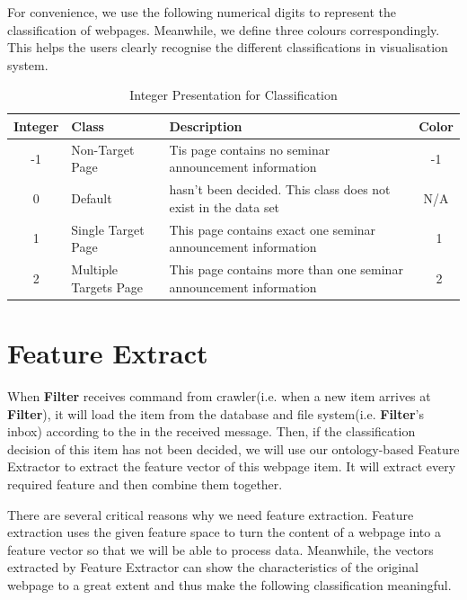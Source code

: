 For convenience, we use the following numerical digits to represent the classification of webpages. Meanwhile, we define three colours correspondingly. This helps the users clearly recognise the different classifications in visualisation system.
\begin{table}[htb!]
\small
\centering
\vspace{-1.5em}
\caption{Integer Presentation for Classification}
\begin{tabular}{@{}cp{}p{}c@{}}
\toprule
  \textbf{Integer}   
& \textbf{Class}
& \textbf{Description} 
& \textbf{Color}\\ 
	\midrule -1
	& Non-Target Page
	& Tis page contains no seminar announcement information
	& \colorbox{c_non}{\color{white}-1} \\
	\midrule 0
	& Default	& hasn't been decided. This class does not exist in the data set
	& N/A\\
	\midrule 1
	& Single Target Page 
	& This page contains exact one seminar announcement information
	& \colorbox{c_sin}{\color{white}\ 1}\\
	\midrule 2
	& Multiple Targets Page
	& This page contains more than one seminar announcement information
	& \colorbox{c_mul}{\color{white}\ 2}\\
	\bottomrule
\end{tabular}
\vspace{-2.5em}
\end{table}

\section{Feature Extract}
\vspace{-0.5em}
When \textbf{Filter} receives command  from crawler(i.e. when a new item arrives at \textbf{Filter}), it will load the item from the database and file system(i.e. \textbf{Filter}'s inbox) according to the  in the received message. Then, if the classification decision of this item has not been decided, we will use our ontology-based Feature Extractor to extract the feature vector of this webpage item. It will extract every required feature and then combine them together\cite{pasupat2014zero}.

There are several critical reasons why we need feature extraction. Feature extraction uses the given feature space to turn the content of a webpage into a feature vector so that we will be able to process data\cite{devi2008generating}. Meanwhile, the vectors extracted by Feature Extractor can show the characteristics of the original webpage to a great extent and thus make the following classification meaningful\cite{FeatureSelection2011,pasupat2014zero}.

